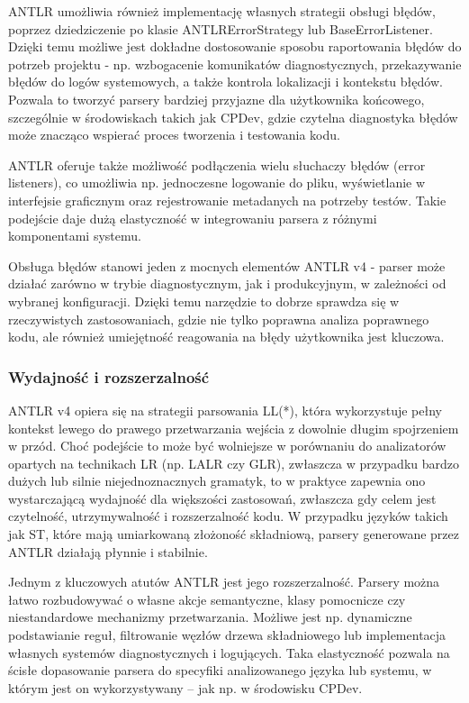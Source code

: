 \documentclass[12pt,twoside]{article}
\begin{document}
ANTLR umożliwia również implementację własnych strategii obsługi błędów, poprzez dziedziczenie po klasie ANTLRErrorStrategy lub BaseErrorListener. Dzięki temu możliwe jest dokładne dostosowanie sposobu raportowania błędów do potrzeb projektu - np. wzbogacenie komunikatów diagnostycznych, przekazywanie błędów do logów systemowych, a także kontrola lokalizacji i kontekstu błędów. Pozwala to tworzyć parsery bardziej przyjazne dla użytkownika końcowego, szczególnie w środowiskach takich jak CPDev, gdzie czytelna diagnostyka błędów może znacząco wspierać proces tworzenia i testowania kodu.

ANTLR oferuje także możliwość podłączenia wielu słuchaczy błędów (error listeners), co umożliwia np. jednoczesne logowanie do pliku, wyświetlanie w interfejsie graficznym oraz rejestrowanie metadanych na potrzeby testów. Takie podejście daje dużą elastyczność w integrowaniu parsera z różnymi komponentami systemu.

Obsługa błędów stanowi jeden z mocnych elementów ANTLR v4 - parser może działać zarówno w trybie diagnostycznym, jak i produkcyjnym, w zależności od wybranej konfiguracji. Dzięki temu narzędzie to dobrze sprawdza się w rzeczywistych zastosowaniach, gdzie nie tylko poprawna analiza poprawnego kodu, ale również umiejętność reagowania na błędy użytkownika jest kluczowa.
\subsubsection{Wydajność i rozszerzalność}
ANTLR v4 opiera się na strategii parsowania LL(*), która wykorzystuje pełny kontekst lewego do prawego przetwarzania wejścia z dowolnie długim spojrzeniem w przód. Choć podejście to może być wolniejsze w porównaniu do analizatorów opartych na technikach LR (np. LALR czy GLR), zwłaszcza w przypadku bardzo dużych lub silnie niejednoznacznych gramatyk, to w praktyce zapewnia ono wystarczającą wydajność dla większości zastosowań, zwłaszcza gdy celem jest czytelność, utrzymywalność i rozszerzalność kodu. W przypadku języków takich jak ST, które mają umiarkowaną złożoność składniową, parsery generowane przez ANTLR działają płynnie i stabilnie.

Jednym z kluczowych atutów ANTLR jest jego rozszerzalność. Parsery można łatwo rozbudowywać o własne akcje semantyczne, klasy pomocnicze czy niestandardowe mechanizmy przetwarzania. Możliwe jest np. dynamiczne podstawianie reguł, filtrowanie węzłów drzewa składniowego lub implementacja własnych systemów diagnostycznych i logujących. Taka elastyczność pozwala na ścisłe dopasowanie parsera do specyfiki analizowanego języka lub systemu, w którym jest on wykorzystywany – jak np. w środowisku CPDev.
\end{document}
